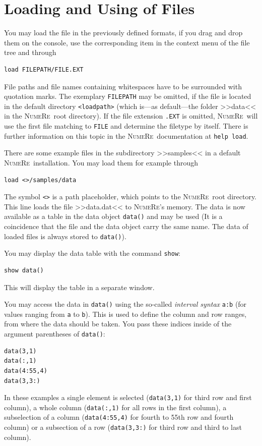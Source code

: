 \documentclass[DIV=14,headsepline,footsepline]{scrbook}
\newcommand{\NR}{\textsc{Nu\-me\-Re}}
\begin{document}
			\section{Loading and Using of Files}
				You may load the file in the previously defined formats, if you drag and drop them on the console, use the corresponding item in the context menu of the file tree and through
				\begin{lstlisting}
load FILEPATH/FILE.EXT
				\end{lstlisting}
				File paths and file names containing whitespaces have to be surrounded with quotation marks. The exemplary \lstinline+FILEPATH+ may be omitted, if the file is located in the default directory \verb+<loadpath>+ (which is---as default---the folder >>data<< in the \NR\ root directory). If the file extension \lstinline+.EXT+ is omitted, \NR\ will use the first file matching to \lstinline+FILE+ and determine the filetype by itself. There is further information on this topic in the \NR\ documentation at \lstinline+help load+.
				
				There are some example files in the subdirectory >>samples<< in a default \NR\ installation. You may load them for example through
				\begin{lstlisting}
load <>/samples/data
				\end{lstlisting}
				The symbol \lstinline+<>+ is a path placeholder, which points to the \NR\ root directory. This line loads the file >>data.dat<< to \NR's memory. The data is now available as a table in the data object \lstinline+data()+ and may be used (It is a coincidence that the file and the data object carry the same name. The data of loaded files is always stored to \lstinline+data()+).
				
				You may display the data table with the command \lstinline+show+:
				\begin{lstlisting}
show data()
				\end{lstlisting}
				This will display the table in a separate window.
				
				You may access the data in \lstinline+data()+ using the so-called \emph{interval syntax} \lstinline+a:b+ (for values ranging from \lstinline+a+ to \lstinline+b+). This is used to define the column and row ranges, from where the data should be taken. You pass these indices inside of the argument parentheses of \lstinline+data()+:
				\begin{lstlisting}
data(3,1)
data(:,1)
data(4:55,4)
data(3,3:)
				\end{lstlisting}
				In these examples a single element is selected (\lstinline+data(3,1)+ for third row and first column), a whole column (\lstinline+data(:,1)+ for all rows in the first column), a subselection of a column (\lstinline+data(4:55,4)+ for fourth to 55th row and fourth column) or a subsection of a row (\lstinline+data(3,3:)+ for third row and third to last column).
				
\end{document}

